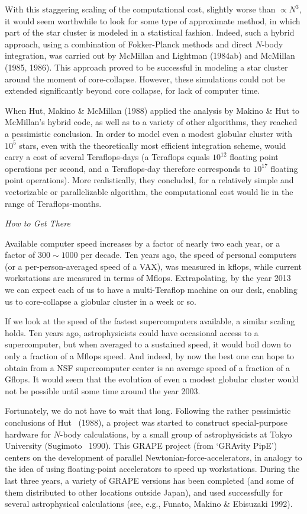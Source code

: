 With this staggering scaling of the computational cost, slightly worse
than $\propto N^3$, it would seem worthwhile to look for some type of
approximate method, in which part of the star cluster is modeled in a
statistical fashion.  Indeed, such a hybrid approach, using a
combination of Fokker-Planck methods and direct $N$-body integration,
was carried out by McMillan and Lightman (1984ab) and McMillan (1985,
1986).  This approach proved to be successful in modeling a star
cluster around the moment of core-collapse.  However, these
simulations could not be extended significantly beyond core collapse,
for lack of computer time.

When Hut, Makino \& McMillan (1988) applied the analysis by Makino \&
Hut to McMillan's hybrid code, as well as to a variety of other
algorithms, they reached a pessimistic conclusion.  In order to model
even a modest globular cluster with $10^5$ stars, even with the
theoretically most efficient integration scheme, would carry a cost of
several Teraflops-days (a Teraflops equals $10^{12}$ floating point
operations per second, and a Teraflops-day therefore corresponds to
$10^{17}$ floating point operations).  More realistically, they
concluded, for a relatively simple and vectorizable or parallelizable
algorithm, the computational cost would lie in the range of
Teraflops-months.

\bigskip
\noindent
{\it How to Get There}
\medskip

Available computer speed increases by a factor of nearly two each
year, or a factor of $300\sim1000$ per decade.  Ten years ago, the
speed of personal computers (or a per-person-averaged speed of a VAX),
was measured in kflops, while current workstations are measured in
terms of Mflops.  Extrapolating, by the year 2013 we can expect each
of us to have a multi-Teraflop machine on our desk, enabling us to
core-collapse a globular cluster in a week or so.

If we look at the speed of the fastest supercomputers available, a
similar scaling holds.  Ten years ago, astrophysicists could have
occasional access to a supercomputer, but when averaged to a sustained
speed, it would boil down to only a fraction of a Mflops speed.  And
indeed, by now the best one can hope to obtain from a NSF
supercomputer center is an average speed of a fraction of a Gflops.
It would seem that the evolution of even a modest globular cluster
would not be possible until some time around the year 2003.

Fortunately, we do not have to wait that long.  Following the rather
pessimistic conclusions of Hut \etal\ (1988), a project was started to
construct special-purpose hardware for $N$-body calculations, by a
small group of astrophysicists at Tokyo University (Sugimoto \etal\
1990).  This GRAPE project (from `GRAvity PipE') centers on the
development of parallel Newtonian-force-accelerators, in analogy to
the idea of using floating-point accelerators to speed up
workstations.  During the last three years, a variety of GRAPE
versions has been completed (and some of them distributed to other
locations outside Japan), and used successfully for several
astrophysical calculations (see, e.g., Funato, Makino \& Ebisuzaki
1992).

